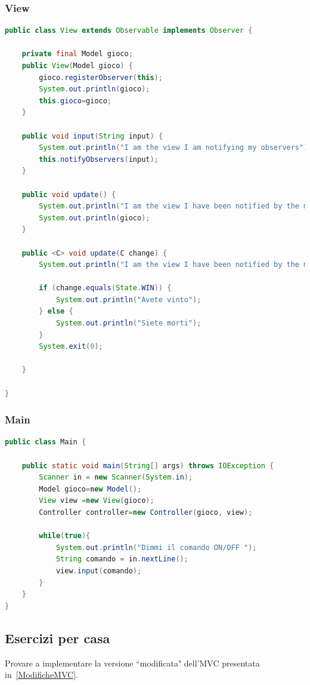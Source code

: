 \documentclass{article}
\begin{document}
\subsubsection{View}
\begin{lstlisting}[language=Java]
public class View extends Observable implements Observer {

	private final Model gioco;
	public View(Model gioco) {
		gioco.registerObserver(this);
		System.out.println(gioco);
		this.gioco=gioco;
	}

	public void input(String input) {
		System.out.println("I am the view I am notifying my observers");
		this.notifyObservers(input);
	}

	public void update() {
		System.out.println("I am the view I have been notified by the model ");
		System.out.println(gioco);
	}

	public <C> void update(C change) {
		System.out.println("I am the view I have been notified by the model with an update C");
		
		if (change.equals(State.WIN)) {
			System.out.println("Avete vinto");
		} else {
			System.out.println("Siete morti");
		}
		System.exit(0);

	}

}
\end{lstlisting}

\subsubsection{Main}
\begin{lstlisting}[language=Java]
public class Main {

	public static void main(String[] args) throws IOException {
		Scanner in = new Scanner(System.in);
		Model gioco=new Model();
		View view =new View(gioco);
		Controller controller=new Controller(gioco, view);
		
		while(true){
			System.out.println("Dimmi il comando ON/OFF ");
			String comando = in.nextLine();
			view.input(comando);
		}
	}
}
\end{lstlisting}

\subsection{Esercizi per casa}
Provare a implementare la versione ``modificata" dell'MVC presentata in~\ref{ModificheMVC}.
\end{document}
